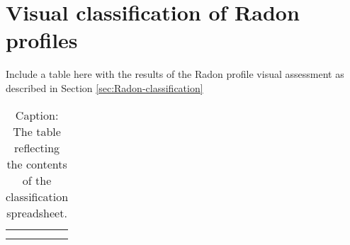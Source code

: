 \section{Visual classification of Radon profiles}
\label{sec:visual-classification-tables}


Include a table here with the results of the Radon profile visual assessment as described in Section \ref{sec:Radon-classification} 

\begin{table}[]
    \centering
    \begin{tabular}{c|c}
         &  \\
         & 
    \end{tabular}
    \caption{Caption: The table reflecting the contents of the classification spreadsheet.}
    \label{tab:visual-class-table}
\end{table}

